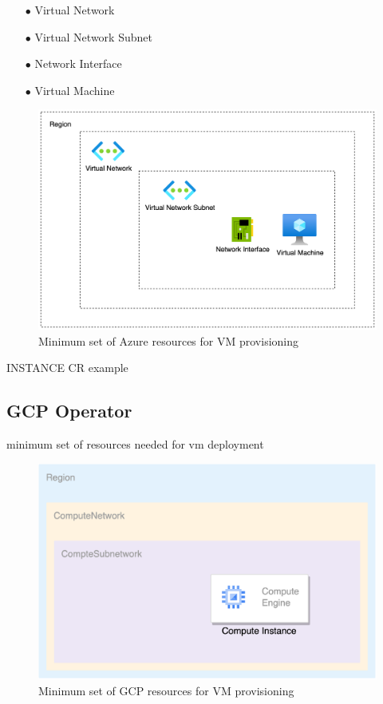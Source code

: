 \begin{itemize}[itemsep=0.2pt, topsep=1pt] \item[$\bullet$] Virtual Network 
\item[$\bullet$] Virtual Network Subnet
\item[$\bullet$] Network Interface
\item[$\bullet$] Virtual Machine
\end{itemize}

\begin{figure}[H]
\centering
\includegraphics[width=0.75\linewidth]{images/azure.png}
\caption{Minimum set of Azure resources for VM provisioning}
\label{fig:azure}
\end{figure}






INSTANCE CR example











\subsection{GCP Operator}

minimum set of resources needed for vm deployment


\begin{figure}[H]
\centering
\includegraphics[width=0.75\linewidth]{images/gcp.png}
\caption{Minimum set of GCP resources for VM provisioning}
\label{fig:gcp}
\end{figure}




